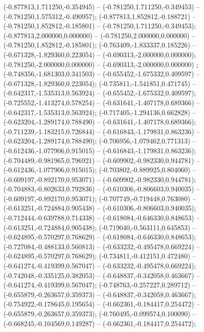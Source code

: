 (-0.877813,1.711250,-0.354945) -- (-0.781250,1.711250,-0.349453) -- (-0.781250,1.575312,-0.490957);
 (-0.877813,1.852812,-0.188721) -- (-0.781250,1.852812,-0.185801) -- (-0.781250,1.711250,-0.349453);
 (-0.877813,2.000000,0.000000) -- (-0.781250,2.000000,0.000000) -- (-0.781250,1.852812,-0.185801);
 (-0.763409,-1.833337,0.185226) -- (-0.671328,-1.829360,0.223054) -- (-0.690313,-2.000000,0.000000);
 (-0.781250,-2.000000,0.000000) -- (-0.690313,-2.000000,0.000000) ;
 (-0.748356,-1.681303,0.341503) -- (-0.655452,-1.675332,0.409597) -- (-0.671328,-1.829360,0.223054);
 (-0.735811,-1.541851,0.471745) -- (-0.642317,-1.535313,0.563924) -- (-0.655452,-1.675332,0.409597);
 (-0.725552,-1.413274,0.578254) -- (-0.631641,-1.407178,0.689366) -- (-0.642317,-1.535313,0.563924);
 (-0.717405,-1.294136,0.662828) -- (-0.623204,-1.289174,0.788490) -- (-0.631641,-1.407178,0.689366);
 (-0.711239,-1.183215,0.726844) -- (-0.616843,-1.179831,0.863236) -- (-0.623204,-1.289174,0.788490);
 (-0.706956,-1.079462,0.771313) -- (-0.612436,-1.077906,0.915015) -- (-0.616843,-1.179831,0.863236);
 (-0.704489,-0.981965,0.796921) -- (-0.609902,-0.982330,0.944781) -- (-0.612436,-1.077906,0.915015);
 (-0.703802,-0.889925,0.804060) -- (-0.609197,-0.892170,0.953071) -- (-0.609902,-0.982330,0.944781);
 (-0.704883,-0.802633,0.792836) -- (-0.610306,-0.806603,0.940035) -- (-0.609197,-0.892170,0.953071);
 (-0.707749,-0.719448,0.763080) -- (-0.613251,-0.724884,0.905438) -- (-0.610306,-0.806603,0.940035);
 (-0.712444,-0.639788,0.714338) -- (-0.618084,-0.646330,0.848653) -- (-0.613251,-0.724884,0.905438);
 (-0.719040,-0.563111,0.645853) -- (-0.624895,-0.570297,0.768629) -- (-0.618084,-0.646330,0.848653);
 (-0.727084,-0.488133,0.560813) -- (-0.633232,-0.495478,0.669224) -- (-0.624895,-0.570297,0.768629);
 (-0.734811,-0.412151,0.472480) -- (-0.641274,-0.419399,0.567047) -- (-0.633232,-0.495478,0.669224);
 (-0.742048,-0.335125,0.382053) -- (-0.648837,-0.342058,0.463667) -- (-0.641274,-0.419399,0.567047);
 (-0.748763,-0.257227,0.289712) -- (-0.655879,-0.263657,0.359373) -- (-0.648837,-0.342058,0.463667);
 (-0.754922,-0.178645,0.195654) -- (-0.662361,-0.184417,0.254472) -- (-0.655879,-0.263657,0.359373);
 (-0.760495,-0.099574,0.100090) -- (-0.668245,-0.104569,0.149287) -- (-0.662361,-0.184417,0.254472);
